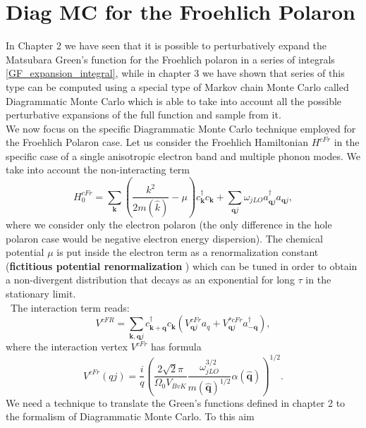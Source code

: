 \section{Diag MC for the Froehlich Polaron}
In Chapter 2 we have seen that it is possible to perturbatively expand the Matsubara Green's function for the Froehlich polaron 
in a series of integrals \ref{GF_expansion_integral}, while in chapter 3 we have shown that series of this type can be computed 
using a special type of Markov chain Monte Carlo called Diagrammatic Monte Carlo which is able to take into account all the possible 
perturbative expansions of the full function and sample from it.\\
We now focus on the specific Diagrammatic Monte Carlo technique employed for the Froehlich Polaron case. Let us consider the 
Froehlich Hamiltonian $H^{cFr}$ in the specific case of a single anisotropic electron band and multiple phonon modes. We take into account 
the non-interacting term
\begin{equation}
    H^{cFr}_0=\sum_{\mathbf{k}}\left(\frac{k^2}{2m(\hat{k})}-\mu\right)c^\dagger_{\mathbf{k}}c_{\mathbf{k}}+\sum_{\mathbf{q}j}\omega_{jLO}a^\dagger_{\mathbf{q}j}a_{\mathbf{q}j},
\end{equation}
where we consider only the electron polaron (the only difference in the hole polaron case would be negative electron energy dispersion). The chemical potential 
$\mu$ is put inside the electron term as a renormalization constant (\textbf{fictitious potential renormalization} \cite{mishchenko2000diagrammatic}\cite{fehske2007computational}) which can be tuned in order to obtain a non-divergent distribution that decays 
as an exponential for long $\tau$ in the stationary limit.\\\
The interaction term reads:
\begin{equation}
    V^{cFR}=\sum_{\mathbf{k},\mathbf{q}j}c^\dagger_{\mathbf{k+q}}c_{\mathbf{k}}\left(V^{cFr}_{\mathbf{q}j}a_q+V^{*cFr}_{\mathbf{q}j}a^\dagger_{-\mathbf{q}}\right),
\end{equation}
where the interaction vertex $V^{cFr}$ has formula
\begin{equation}
    V^{cFr}(qj)=\frac{i}{q}\left(\frac{2\sqrt{2}\pi}{\Omega_0V_{BvK}}\frac{\omega_{jLO}^{3/2}}{m(\hat{\mathbf{q}})^{1/2}}\alpha(\hat{\mathbf{q}})\right)^{1/2}.
\end{equation}
We need a technique to translate the Green's functions defined in chapter 2 to the formalism of Diagrammatic Monte Carlo. To this aim 
